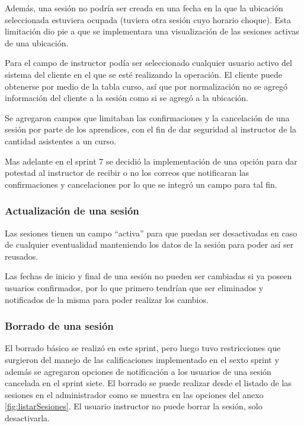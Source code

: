 Además, una sesión no podría ser creada en una fecha en la que la ubicación seleccionada estuviera ocupada (tuviera otra sesión cuyo horario choque). Esta limitación dio pie a que se implementara una visualización de las sesiones activas de una ubicación.

Para el campo de instructor podía ser seleccionado cualquier usuario activo del sistema del cliente en el que se esté realizando la operación. El cliente puede obtenerse por medio de la tabla curso, así que por normalización no se agregó información del cliente a la sesión como si se agregó a la ubicación.

Se agregaron campos que limitaban las confirmaciones y la cancelación de una sesión por parte de los aprendices, con el fin de dar seguridad al instructor de la cantidad asistentes a un curso.

Mas adelante en el sprint 7 se decidió la implementación de una opción para dar potestad al instructor de recibir o no los correos que notificaran las confirmaciones y cancelaciones por lo que se integró un campo para tal fin.

\subsubsection {Actualización de una sesión}

Las sesiones tienen un campo ``activa'' para que puedan ser desactivadas en caso de cualquier eventualidad manteniendo los datos de la sesión para poder así ser reusados.

Las fechas de inicio y final de una sesión no pueden ser cambiadas si ya poseen usuarios confirmados, por lo que primero tendrían que ser eliminados y notificados de la misma para poder realizar los cambios.

\subsubsection{Borrado de una sesión}

El borrado básico se realizó en este sprint, pero luego tuvo restricciones que surgieron del manejo de las calificaciones implementado en el sexto sprint y además se agregaron opciones de notificación a los usuarios de una sesión cancelada en el sprint siete. El borrado se puede realizar desde el listado de las sesiones en el administrador como se muestra en las opciones del anexo \ref{fig:listarSesiones}. El usuario instructor no puede borrar la sesión, solo desactivarla.

